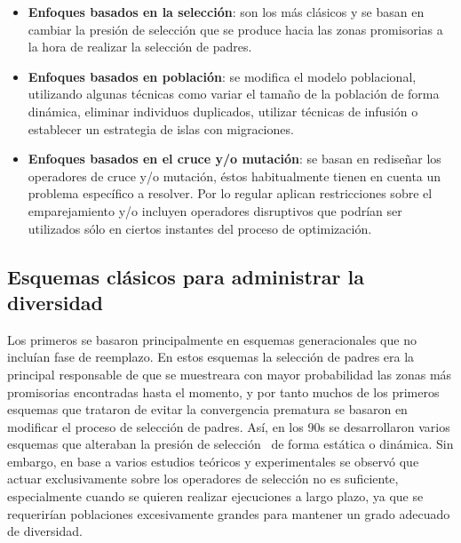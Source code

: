 \begin{itemize}
\item \textbf{Enfoques basados en la selección}: son los más clásicos y se basan en cambiar la presión de selección que se produce hacia las zonas promisorias a la hora de realizar
la selección de padres.
\item \textbf{Enfoques basados en población}: se modifica el modelo poblacional, utilizando algunas técnicas como variar el tamaño de la población de forma
dinámica, eliminar individuos duplicados, utilizar técnicas de infusión o establecer un estrategia de islas con migraciones.
\item \textbf{Enfoques basados en el cruce y/o mutación}: se basan en rediseñar los operadores de cruce y/o mutación, éstos habitualmente tienen en cuenta un problema específico a resolver. Por lo regular aplican restricciones sobre el emparejamiento y/o incluyen operadores disruptivos que podrían ser utilizados sólo en ciertos instantes del proceso
de optimización.
\end{itemize}


\subsection{Esquemas clásicos para administrar la diversidad}

Los primeros \EAS{} se basaron principalmente en esquemas generacionales que no incluían fase de reemplazo.
%
En estos esquemas la selección de padres era la principal responsable de que se muestreara con mayor probabilidad las zonas
más promisorias encontradas hasta el momento, y por tanto muchos de los primeros esquemas que trataron de evitar la convergencia 
prematura se basaron en modificar el proceso de selección de padres.
%
Así, en los 90s se desarrollaron varios esquemas que alteraban la presión de selección~\cite{eiben2003introduction}
de forma estática o dinámica.
%
Sin embargo, en base a varios estudios teóricos y experimentales se observó que actuar exclusivamente sobre los operadores de selección no es suficiente, especialmente
cuando se quieren realizar ejecuciones a largo plazo, ya que se requerirían poblaciones excesivamente grandes para mantener un grado adecuado de diversidad.

